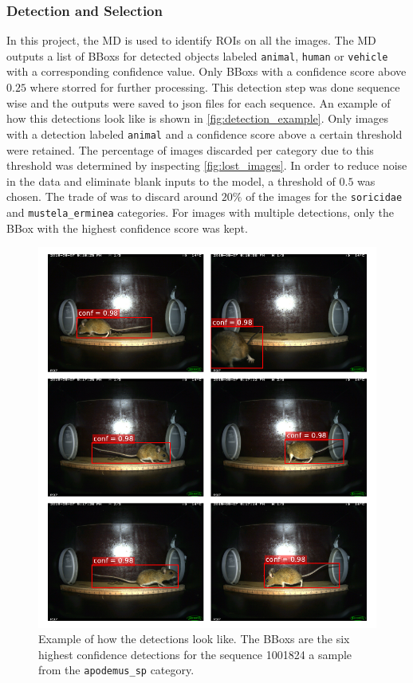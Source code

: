         \subsubsection{Detection and Selection}
        In this project, the \ac{MD} \autocite{morrisEfficientPipelineCamera2025} is used to identify \acsp{ROI} on all the images.
        The \ac{MD} outputs a list of \acp{BBox} for detected objects labeled \texttt{animal}, \texttt{human} or \texttt{vehicle} with a corresponding confidence value.
        Only \acp{BBox} with a confidence score above \(0.25\) where storred for further processing.
        This detection step was done sequence wise and the outputs were saved to json files for each sequence.
        An example of how this detections look like is shown in \autoref{fig:detection_example}.
        Only images with a detection labeled \texttt{animal} and a confidence score above a certain threshold were retained.  
        The percentage of images discarded per category due to this threshold was determined by inspecting \autoref{fig:lost_images}.  
        In order to reduce noise in the data and eliminate blank inputs to the model, a threshold of \(0.5\) was chosen.
        The trade of was to discard around \(20\%\) of the images for the \texttt{soricidae} and \texttt{mustela\_erminea} categories.
        For images with multiple detections, only the \ac{BBox} with the highest confidence score was kept.

        \begin{figure}[p]
        \centering
        \includegraphics{figures/detections_on_a_sequence.pdf}
        \caption{Example of how the detections look like. The \acsp{BBox} are the six highest confidence detections for the sequence 1001824 a sample from the \texttt{apodemus\_sp} category.}
        \label{fig:detection_example}
        \end{figure}

